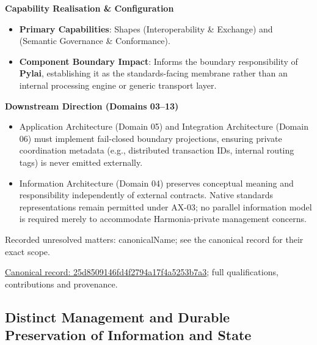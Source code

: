 \par\medskip\textbf{Capability Realisation \& Configuration}\par


\begin{itemize}


\item \textbf{Primary Capabilities}: Shapes \texttt{} (Interoperability \& Exchange) and \texttt{} (Semantic Governance \& Conformance).

\item \textbf{Component Boundary Impact}: Informs the boundary responsibility of \textbf{Pylai}, establishing it as the standards-facing membrane rather than an internal processing engine or generic transport layer.

\end{itemize}


\par\medskip\textbf{Downstream Direction (Domains 03–13)}\par


\begin{itemize}


\item Application Architecture (Domain 05) and Integration Architecture (Domain 06) must implement fail-closed boundary projections, ensuring private coordination metadata (e.g., distributed transaction IDs, internal routing tags) is never emitted externally.

\item Information Architecture (Domain 04) preserves conceptual meaning and responsibility independently of external contracts. Native standards representations remain permitted under AX-03; no parallel information model is required merely to accommodate Harmonia-private management concerns.

\end{itemize}

{\small Recorded unresolved matters: canonicalName; see the canonical record for their exact scope.}\par
{\footnotesize \href{../../../../continuum/strategy/course-of-action/25d8509146fd4f2794a17f4a5253b7a3.md}{Canonical record: 25d8509146fd4f2794a17f4a5253b7a3}; full qualifications, contributions and provenance.}\par
\subsection{Distinct Management and Durable Preservation of Information and State}

